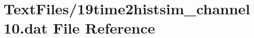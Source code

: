 \hypertarget{19time2histsim__channel10_8dat}{}\section{Text\+Files/19time2histsim\+\_\+channel10.dat File Reference}
\label{19time2histsim__channel10_8dat}
